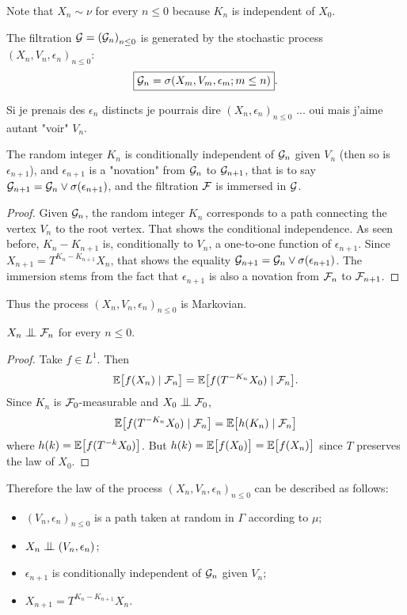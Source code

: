 \documentclass[12pt,a4paper]{article}
\begin{document}
Note that $X_n \sim \nu$ for every $n \leq 0$ because $K_n$ is independent of $X_0$.

The filtration $\mathcal{G}={(\mathcal{G}_n)}_{n \leq 0}$ is  generated by the stochastic process 
${(X_n, V_n, \epsilon_n)}_{n \leq 0}$:
$$
\boxed{\mathcal{G}_n = \sigma(X_m, V_m, \epsilon_m; m \leq n)}. 
$$


\begin{remark}
Si je prenais des $\epsilon_n$ distincts je pourrais dire 
${(X_n, \epsilon_n)}_{n \leq 0}$ ... oui mais j'aime autant "voir" $V_n$.
\end{remark}

\begin{lemma}
The random integer $K_n$ is conditionally independent of $\mathcal{G}_n$ 
given $V_n$ (then so is  $\epsilon_{n+1}$), and  $\epsilon_{n+1}$ is 
a "novation" from $\mathcal{G}_n$ to $\mathcal{G}_{n+1}$, that is 
to say $\mathcal{G}_{n+1} = \mathcal{G}_n \vee \sigma(\epsilon_{n+1})$, and  
the filtration $\mathcal{F}$ is immersed in $\mathcal{G}$. 
\end{lemma}

\begin{proof}
Given $\mathcal{G}_n$, the random integer $K_n$ corresponds to a path  
connecting the vertex $V_n$ to the root vertex. 
That shows the conditional independence. 
As seen before, $K_{n}-K_{n+1}$ is, conditionally to $V_n$, 
a one-to-one function of $\epsilon_{n+1}$. Since 
$X_{n+1} = T^{K_{n}-K_{n+1}}X_n$, that shows the equality 
$\mathcal{G}_{n+1} = \mathcal{G}_n \vee \sigma(\epsilon_{n+1})$. 
The immersion stems from the fact that 
 $\epsilon_{n+1}$ is also a novation from $\mathcal{F}_n$ to $\mathcal{F}_{n+1}$.  
\end{proof}

Thus the process ${(X_n, V_n, \epsilon_n)}_{n \leq 0}$ is Markovian. 


\begin{lemma}
$X_n \indep \FF_n$ for every $n \leq 0$.
\end{lemma}

\begin{proof}
Take $f \in L^1$. Then
$$
\mathbb{E}\bigl[ f(X_n) \mid \mathcal{F}_n\bigr] 
= \mathbb{E}\bigl[ f(T^{-K_n}X_0) \mid \mathcal{F}_n\bigr]. 
$$
Since $K_n$ is $\mathcal{F}_0$-measurable and $X_0 \indep \FF_0$, 
$$
\mathbb{E}\bigl[ f(T^{-K_n}X_0) \mid \mathcal{F}_n\bigr] = 
\mathbb{E}\bigl[ h(K_n) \mid \mathcal{F}_n\bigr]
$$
where $h(k) = \mathbb{E}\bigl[ f(T^{-k}X_0)\bigr]$. 
But $h(k) =   \mathbb{E}\bigl[ f(X_0)\bigr]=  \mathbb{E}\bigl[ f(X_n)\bigr]$ 
since $T$ preserves the law of $X_0$. 
\end{proof}

Therefore the law of the process ${(X_n,V_n,\epsilon_n)}_{n \leq 0}$ can 
be described as follows:
\begin{itemize}
\item ${(V_n,\epsilon_n)}_{n \leq 0}$ is a path taken at random in $\Gamma$ 
according to $\mu$;

\item $X_n \indep (V_n,\epsilon_n)$;

\item $\epsilon_{n+1}$ is conditionally independent of $\mathcal{G}_n$ given $V_n$;

\item $X_{n+1} = T^{K_n-K_{n+1}}X_n$.
\end{itemize}
\end{document}
